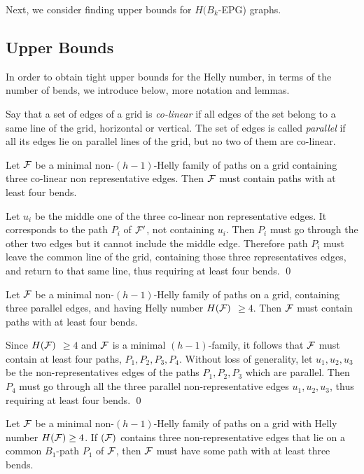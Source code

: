 Next, we consider finding  upper bounds for $H(B_k$-EPG) graphs.

\subsection{Upper Bounds}\label{subsec-upper}

In order to obtain  tight upper bounds for the Helly number, in terms of the number of bends, we introduce below, more notation and lemmas.

Say that a set of edges of a grid is {\it co-linear} if all edges of the set belong to a same line of the grid, horizontal or vertical. The set of edges is called {\it parallel} if all its edges lie on parallel lines of the grid, but no two of them are co-linear.  


\begin{lemma}
\label{lemma:3colin}
Let $\cal {F}$ be a minimal non-$(h-1)$-Helly family of paths on a grid  containing  three co-linear non representative edges. Then $\cal{F}$ must contain paths with at least four bends.
\end{lemma}

\proof
Let $u_i$ be the middle one of the three co-linear non representative edges. It corresponds to the  path $P_i$ of $\cal {F'}$, not containing $u_i$.
Then $P_i$ must go through  the other two edges but it cannot include the middle edge. Therefore path $P_i$ must leave the common line of the grid, containing those three representatives edges, and return to that same line, thus requiring at least four bends.
\qed


\begin{lemma}
\label{lemma:3par}
Let $\cal{F}$ be a minimal non-$(h-1)$-Helly family of paths on a grid, containing three parallel edges, and having  Helly number $H(\cal{F})$   $\geq 4$. Then $\cal{F}$ must contain paths with at least four bends. 
\end{lemma}

\proof
Since $H(\cal{F}) $ $\geq 4$ and $\cal{F}$ is a minimal $(h-1)$-family, it follows that $\cal{F}$ must contain at least four paths, $P_1,P_2,P_3,P_4$. Without loss of generality, let $u_1,u_2,u_3$ be the non-representatives edges of the paths $P_1,P_2,P_3$ which are parallel. Then $P_4$ must go through all the three parallel non-representative edges $u_1,u_2,u_3$, thus requiring at least four bends. 
\qed


\begin{lemma} \label{lemma:Lwit}
Let $\cal{F}$ be a minimal non-$(h-1)$-Helly family of paths on a grid with  Helly number $H({\cal F}) \geq 4$. If ${\cal(F)}$ contains  three non-representative edges that  lie on a common $B_1$-path $P_1$ of $\cal{F}$, then $\cal {F}$ must have some path with at least three bends. \end{lemma}

